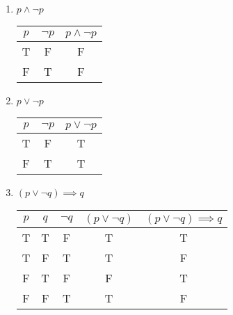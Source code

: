 \documentclass{article}
\begin{document}
\begin{enumerate}[label = \boldalph]
	\item $ p \land \neg p $ \\
	      \begin{tabular}{ | c | c | c | }
		      $ p $ & $ \neg p $ & $ p \land \neg p $ \\
		      \hline
		      T     & F          & F                  \\
		      F     & T          & F                  \\
	      \end{tabular}

	\item $ p \lor \neg p $ \\
	      \begin{tabular}{ | c | c | c | }
		      $ p $ & $ \neg p $ & $ p \lor \neg p $ \\
		      \hline
		      T     & F          & T                 \\
		      F     & T          & T                 \\
	      \end{tabular}

	\item $ \left( p \lor \neg q \right) \implies q $ \\
	      \begin{tabular}{ | c | c | c | c | c | }
		      $ p $ & $ q $ & $ \neg q $ & $ \left( p \lor \neg q \right) $ & $ \left( p \lor \neg q \right) \implies q $ \\
		      \hline
		      T     & T     & F          & T                                & T                                           \\
		      T     & F     & T          & T                                & F                                           \\
		      F     & T     & F          & F                                & T                                           \\
		      F     & F     & T          & T                                & F                                           \\
	      \end{tabular}


\end{enumerate}
\end{document}
